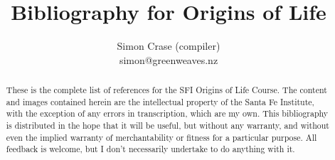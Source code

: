 \documentclass[]{article}
\title{
	Bibliography for Origins of Life
}
\author{Simon Crase (compiler)\\simon@greenweaves.nz}
\begin{document}
\maketitle

\begin{abstract}
	These is the complete list of references for the SFI Origins of Life Course. 
	The content and images contained herein are the intellectual property of the Santa Fe Institute, with the exception of any errors in transcription, which are my own.
	This bibliography is distributed in the hope that it will be useful,
	but without any warranty, and without even the implied warranty of
	merchantability or fitness for a particular purpose. All feedback is welcome,
	but I don't necessarily undertake to do anything with it.
\end{abstract}

\nocite{*}


\end{document}
